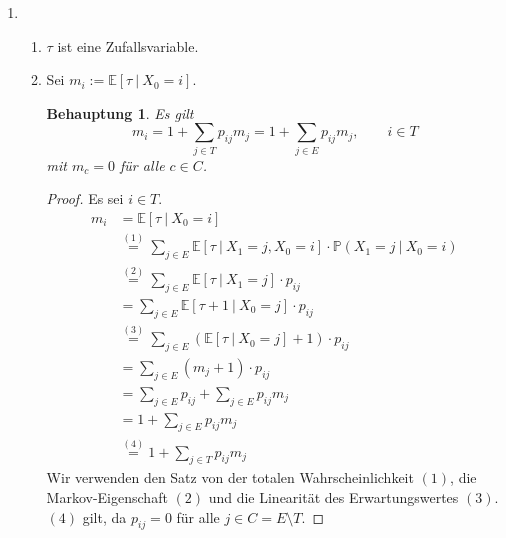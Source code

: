 \documentclass[a4paper]{scrartcl}
\newtheorem*{behaupt}{Behauptung}
\newcommand{\prob}{\mathbb{P}}
\newcommand{\e}{\mathbb{E}}
\def \blattnr {3}
\begin{document}
\begin{enumerate}[label=\bfseries \blattnr.\arabic*]
   \item
       \begin{enumerate}
           \item
               $\tau$ ist eine Zufallsvariable.

           \item
               Sei $m_i := \e[\tau\ |\ X_0 = i]$.
               \begin{behaupt}
                   Es gilt
                   \begin{equation*}
                       m_i = 1 + \sum_{j \in T} p_{ij}m_j
                       = 1 + \sum_{j \in E} p_{ij}m_j
                       , \qquad i \in T
                   \end{equation*}
                   mit $m_c = 0$ für alle $c \in C$.
               \end{behaupt}
               \begin{proof}
                   Es sei $i \in T$.
                   \begin{equation*}
                       \begin{split}
                           m_i &= \e[\tau\ |\ X_0 = i] \\
                               &\overset{(1)}{=} \sum_{j \in E}
                                    \e[\tau\ |\ X_1 = j, X_0 = i]
                                    \cdot \prob(X_1 = j\ |\ X_0 = i) \\
                               &\overset{(2)}{=} \sum_{j \in E}
                                    \e[\tau\ |\ X_1 = j]
                                    \cdot p_{ij} \\
                               &= \sum_{j \in E}
                                    \e[\tau + 1\ |\ X_0 = j]
                                    \cdot p_{ij} \\
                               &\overset{(3)}{=} \sum_{j \in E}
                                    (\e[\tau\ |\ X_0 = j] + 1)
                                    \cdot p_{ij} \\
                               &= \sum_{j \in E} (m_j + 1) \cdot p_{ij} \\
                               &= \sum_{j \in E} p_{ij} +
                                    \sum_{j \in E} p_{ij} m_j \\
                               &= 1 + \sum_{j \in E} p_{ij} m_j \\
                               &\overset{(4)}{=} 1 + \sum_{j \in T} p_{ij} m_j
                       \end{split}
                   \end{equation*}
                   Wir verwenden den Satz von der totalen Wahrscheinlichkeit
                   $(1)$, die Markov-Eigenschaft $(2)$ und die Linearität des
                   Erwartungswertes $(3)$.
                   $(4)$ gilt, da $p_{ij} = 0$ für alle $j \in C = E
                   \setminus T$.
               \end{proof}


\end{enumerate}
\end{enumerate}
\end{document}
